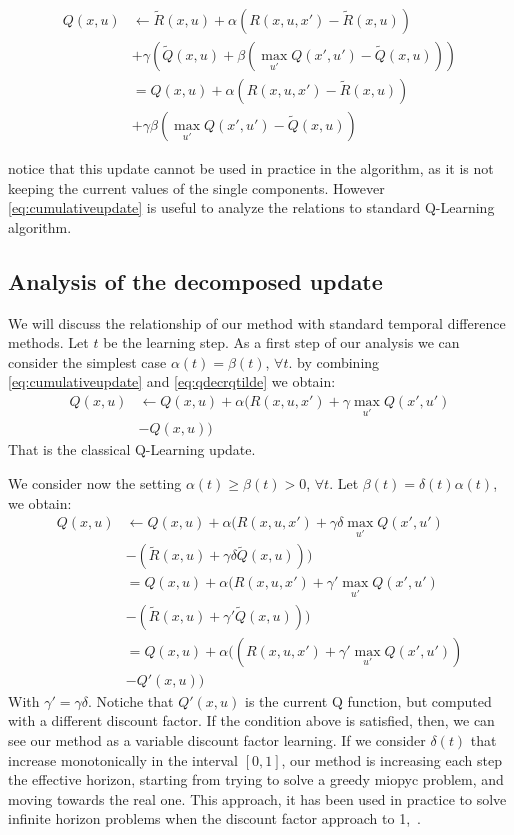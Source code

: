 \documentclass[conference]{IEEEtran}
\begin{document}
\begin{align}
Q(x,u) & \leftarrow\tilde{R}(x,u)+\alpha(R(x,u,x')-\tilde{R}(x,u)) \nonumber\\
 & +\gamma\left(\tilde{Q}(x,u)+\beta(\max_{u'}Q(x',u')-\tilde{Q}(x,u))\right) \nonumber\\
 & =Q(x,u)+\alpha(R(x,u,x')-\tilde{R}(x,u)) \nonumber\\
 & +\gamma\beta(\max_{u'}Q(x',u')-\tilde{Q}(x,u))
 \label{eq:cumulativeupdate}
\end{align}

notice that this update cannot be used in practice in the algorithm, as it is not keeping the current values of the single components. However \ref{eq:cumulativeupdate} is useful to analyze the relations to standard Q-Learning algorithm.

\subsection{Analysis of the decomposed update}
We will discuss the relationship of our method with standard temporal difference methods. Let $t$ be the learning step. As a first step of our analysis we can consider the simplest case $\alpha(t)=\beta(t)$, $\forall t$.
by combining \ref{eq:cumulativeupdate} and \ref{eq:qdecrqtilde} we obtain:
\begin{align}
Q(x,u) & \leftarrow Q(x,u)+\alpha(R(x,u,x')+\gamma\max_{u'}Q(x',u')\nonumber\\
 & -Q(x,u))
\end{align}
That is the classical Q-Learning update. 

We consider now the setting $\alpha(t)\geq\beta(t)>0$, $\forall t$. Let $\beta(t)=\delta(t)\alpha(t)$, we obtain:
\begin{align}
Q(x,u) & \leftarrow Q(x,u)+\alpha(R(x,u,x')+\gamma\delta \max_{u'}Q(x',u') \nonumber\\
 & -(\tilde{R}(x,u)+\gamma\delta\tilde{Q}(x,u))) \nonumber\\
 & =Q(x,u)+\alpha(R(x,u,x')+\gamma'\max_{u'}Q(x',u') \nonumber\\
 & -(\tilde{R}(x,u)+\gamma'\tilde{Q}(x,u))) \nonumber\\
 & =Q(x,u)+\alpha((R(x,u,x')+\gamma'\max_{u'}Q(x',u')) \nonumber\\
 & -Q'(x,u))
\end{align}
With $\gamma'=\gamma\delta$. Notiche that $Q'(x,u)$ is the current Q function, but computed with a different discount factor. If the condition above is satisfied, then, we can see our method as a variable discount factor learning. If we consider $\delta(t)$ that increase monotonically in the interval $[0,1]$, our method is increasing each step the effective horizon, starting from trying to solve a greedy miopyc problem, and moving towards the real one. This approach, it has been used in practice to solve infinite horizon problems when the discount factor approach to 1,~\cite{}.
\end{document}
